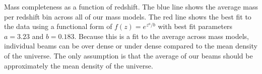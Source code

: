 \label{fig:mass_complete} Mass completeness as a function of redshift. The blue line shows the average mass per redshift bin across all of our mass models. The red line shows the best fit to the data using a functional form of $f(z) = e^{z^a / b}$ with best fit parameters $a = 3.23$ and $b = 0.183$. Because this is a fit to the average across mass models, individual beams can be over dense or under dense compared to the mean density of the universe. The only assumption is that the average of our beams should be approximately the mean density of the universe.
  